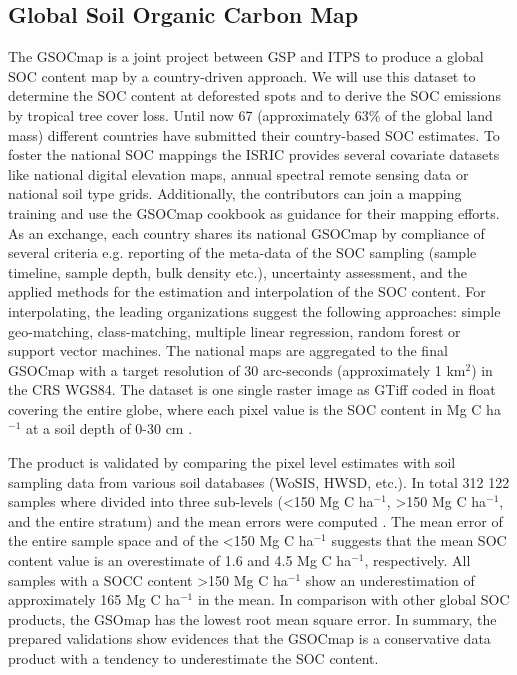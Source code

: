	\subsection{Global Soil Organic Carbon Map}
		The \ac{GSOCmap} is a joint project between \ac{GSP} and \ac{ITPS} to produce a global \ac{SOC} content map by a country-driven approach. We will use this dataset to determine the \ac{SOC} content at deforested spots and to derive the \ac{SOC} emissions by tropical tree cover loss. Until now 67 (approximately 63\% of the global land mass) different countries have submitted their country-based \ac{SOC} estimates. To foster the national \ac{SOC} mappings the \ac{ISRIC} provides several covariate datasets like national digital elevation maps, annual spectral remote sensing data or national soil type grids. Additionally, the contributors can join a mapping training and use the \ac{GSOCmap} cookbook as guidance for their mapping efforts. As an exchange, each country shares its national \ac{GSOCmap} by compliance of several criteria e.g. reporting of the meta-data of the \ac{SOC} sampling (sample timeline, sample depth, bulk density etc.), uncertainty assessment, and the applied methods for the estimation and interpolation of the \ac{SOC} content. For interpolating, the leading organizations suggest the following approaches: simple geo-matching, class-matching, multiple linear regression, random forest or support vector machines. The national maps are aggregated to the final \ac{GSOCmap} with a target resolution of 30 arc-seconds (approximately 1 km$^2$) in the \ac{CRS} \ac{WGS84}. The dataset is one single raster image as \ac{GTiff} coded in float covering the entire globe, where each pixel value is the \ac{SOC} content in Mg C ha$^{-1}$ at a soil depth of 0-30 cm \citep{FAO2018}.

		The product is validated by comparing the pixel level estimates with soil sampling data from various soil databases (WoSIS, HWSD, etc.). In total 312 122 samples where divided into three sub-levels (<150 Mg C ha$^{-1}$, >150 Mg C ha$^{-1}$, and the entire stratum) and the mean errors were computed . The mean error of the entire sample space and of the <150 Mg C ha$^{-1}$ suggests that the mean \ac{SOC} content value is an overestimate of 1.6 and 4.5 Mg C ha$^{-1}$, respectively. All samples with a \ac{SOCC} content >150 Mg C ha$^{-1}$ show an underestimation of approximately 165 Mg C ha$^{-1}$ in the mean. In comparison with other global \ac{SOC} products, the \ac{GSOmap} has the lowest root mean square error. In summary, the prepared validations show evidences that the \ac{GSOCmap} is a conservative data product with a tendency to underestimate the \ac{SOC} content.

